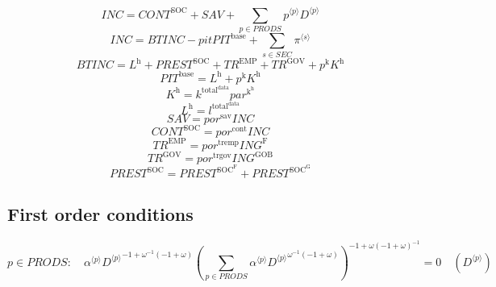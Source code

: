 \begin{equation}
{I\!N\!C} = {C\!O\!N\!T}^{\mathrm{SOC}} + {S\!A\!V} + \sum_{p\in {P\!R\!O\!D\!S}} {{p}^{\langle p\rangle}} {{D}^{\langle p\rangle}}
\end{equation}
\begin{equation}
{I\!N\!C} = {B\!T\!I\!N\!C} - {{p\!i\!t}} {{P\!I\!T}^{\mathrm{base}}} + \sum_{s\in {S\!E\!C}} {\pi}^{\langle s\rangle}
\end{equation}
\begin{equation}
{B\!T\!I\!N\!C} = L^{\mathrm{h}} + {P\!R\!E\!S\!T}^{\mathrm{SOC}} + {T\!R}^{\mathrm{EMP}} + {T\!R}^{\mathrm{GOV}} + {p^{\mathrm{k}}} {K^{\mathrm{h}}}
\end{equation}
\begin{equation}
{P\!I\!T}^{\mathrm{base}} = L^{\mathrm{h}} + {p^{\mathrm{k}}} {K^{\mathrm{h}}}
\end{equation}
\begin{equation}
K^{\mathrm{h}} = {k^{\mathrm{total}^{\mathrm{data}}}} {{p\!a\!r}^{\mathrm{k}^{\mathrm{h}}}}
\end{equation}
\begin{equation}
L^{\mathrm{h}} = l^{\mathrm{total}^{\mathrm{data}}}
\end{equation}
\begin{equation}
{S\!A\!V} = {{p\!o\!r}^{\mathrm{sav}}} {{I\!N\!C}}
\end{equation}
\begin{equation}
{C\!O\!N\!T}^{\mathrm{SOC}} = {{p\!o\!r}^{\mathrm{cont}}} {{I\!N\!C}}
\end{equation}
\begin{equation}
{T\!R}^{\mathrm{EMP}} = {{p\!o\!r}^{\mathrm{tremp}}} {{I\!N\!G}^{\mathrm{F}}}
\end{equation}
\begin{equation}
{T\!R}^{\mathrm{GOV}} = {{p\!o\!r}^{\mathrm{trgov}}} {{I\!N\!G}^{\mathrm{GOB}}}
\end{equation}
\begin{equation}
{P\!R\!E\!S\!T}^{\mathrm{SOC}} = {P\!R\!E\!S\!T}^{\mathrm{SOC}^{\mathrm{F}}} + {P\!R\!E\!S\!T}^{\mathrm{SOC}^{\mathrm{G}}}
\end{equation}


\subsection{First order conditions}

\begin{equation}
p\in {P\!R\!O\!D\!S}\colon\quad {{\alpha}^{\langle p\rangle}} {{{D}^{\langle p\rangle}}^{-1 + {\omega}^{-1} \left(-1 + \omega\right)}} {\left(\sum_{p\in {P\!R\!O\!D\!S}} {{\alpha}^{\langle p\rangle}} {{{D}^{\langle p\rangle}}^{{\omega}^{-1} \left(-1 + \omega\right)}}\right)^{-1 + {\omega} \left(-1 + \omega\right)^{-1}}} = 0
 \quad \left({D}^{\langle p\rangle}\right)
\end{equation}





